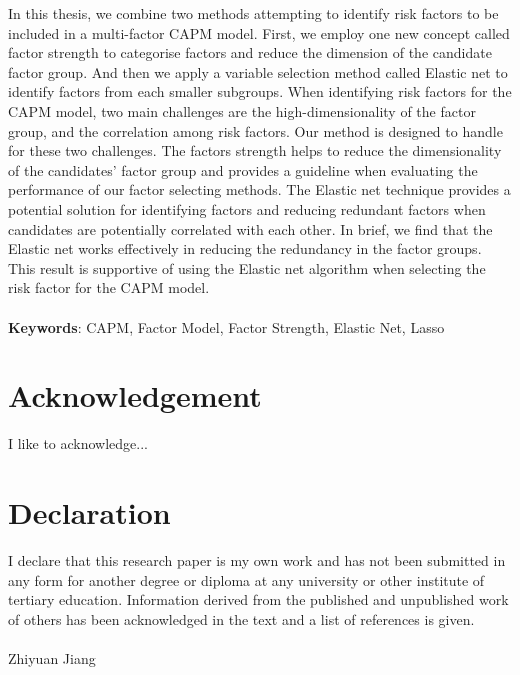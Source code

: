 In this thesis, we combine two methods attempting to identify risk factors to be included in a multi-factor CAPM model.
First, we employ one new concept called factor strength to categorise factors and reduce the dimension of the candidate factor group.
And then we apply a variable selection method called Elastic net to identify factors from each smaller subgroups.
When identifying risk factors for the CAPM model, two main challenges are the high-dimensionality of the factor group, and the correlation among risk factors.
Our method is designed to handle for these two challenges. 
The factors strength helps to reduce the dimensionality of the candidates' factor group and provides a guideline when evaluating the performance of our factor selecting methods.
The Elastic net technique provides a potential solution for identifying factors and reducing redundant factors when candidates are potentially correlated with each other.
In brief, we find that the Elastic net works effectively in reducing the redundancy in the factor groups.
This result is supportive of using the Elastic net algorithm when selecting the risk factor for the CAPM model.\\
\vspace{0.5cm}\\
 \textbf{Keywords}: CAPM, Factor Model, Factor Strength, Elastic Net, Lasso


\chapter*{Acknowledgement}
I like to acknowledge...

\chapter*{Declaration}
I declare that this research paper is my own work and has not been submitted in any form for another degree or diploma at any university or other institute of tertiary education. Information derived from the published and unpublished work of others has been acknowledged in the text and a list of references is given.\\
\vspace{0.7cm}\\
Zhiyuan Jiang

